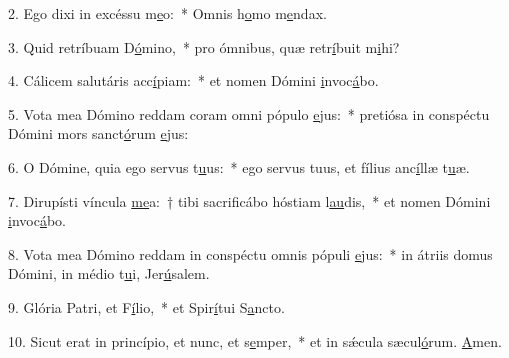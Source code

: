 2. Ego dixi in excéssu m\uline{e}o:~* Omnis h\uline{o}mo m\uline{e}ndax.\par 
3. Quid retríbuam D\uline{ó}mino,~* pro ómnibus, quæ retr\uline{í}buit m\uline{i}hi?\par 
4. Cálicem salutáris acc\uline{í}piam:~* et nomen Dómini \uline{i}nvoc\uline{á}bo.\par 
5. Vota mea Dómino reddam coram omni pópulo \uline{e}jus:~* pretiósa in conspéctu Dómini mors sanct\uline{ó}rum \uline{e}jus:\par 
6. O Dómine, quia ego servus t\uline{u}us:~* ego servus tuus, et fílius anc\uline{í}llæ t\uline{u}æ.\par 
7. Dirupísti víncula \uline{me}a:~† tibi sacrificábo hóstiam l\uline{au}dis,~* et nomen Dómini \uline{i}nvoc\uline{á}bo.\par 
8. Vota mea Dómino reddam in conspéctu omnis pópuli \uline{e}jus:~* in átriis domus Dómini, in médio t\uline{u}i, Jer\uline{ú}salem.\par 
9. Glória Patri, et F\uline{í}lio,~* et Spir\uline{í}tui S\uline{a}ncto.\par 
10. Sicut erat in princípio, et nunc, et s\uline{e}mper,~* et in sǽcula sæcul\uline{ó}rum. \uline{A}men.\par 
